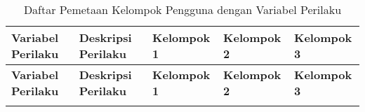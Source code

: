 \RaggedLeft
\begin{small}
\begin{longtable}[c]{|>{\ccnormspacing}m{}|>{\ccnormspacing}m{}|>{\ccnormspacingcenter}m{}|>{\ccnormspacingcenter}m{}|>{\ccnormspacingcenter}m{}|}
  \caption{Daftar Pemetaan Kelompok Pengguna dengan Variabel Perilaku}
  \label{tab:pemetaan_perilaku} \\
  \hline \rowcolor[HTML]{A3E5F5}
  \centering\textbf{Variabel Perilaku} & \centering\textbf{Deskripsi Perilaku} & \textbf{Kelompok 1} & \textbf{Kelompok 2} & \textbf{Kelompok 3} \\ \hline \endfirsthead
  \hline \rowcolor[HTML]{A3E5F5}
  \centering\textbf{Variabel Perilaku} & \centering\textbf{Deskripsi Perilaku} & \textbf{Kelompok 1} & \textbf{Kelompok 2} & \textbf{Kelompok 3} \\ \hline \endhead

  \hline \endfoot


\end{longtable}
\end{small}
